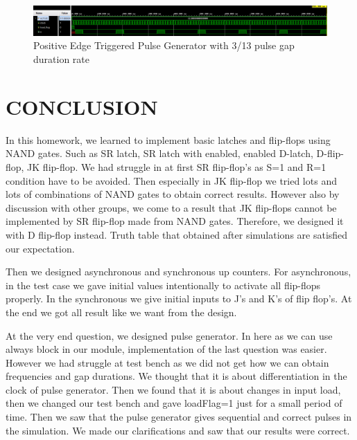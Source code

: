 \documentclass[pdftex,12pt,a4paper]{article}
\begin{document}
    \begin{figure}[H]
    	\centering
    	\includegraphics[width=1\textwidth]{simulations/pulse_3_13_gap.png}	
    	\caption{Positive Edge Triggered Pulse Generator with 3/13 pulse gap duration rate}
    	\label{Positive Edge Triggered Pulse Generator}
    \end{figure}

\pagebreak

\section{CONCLUSION}
In this homework, we learned to implement basic latches and flip-flops using NAND gates. Such as SR latch, SR latch with enabled, enabled D-latch, D-flip-flop, JK flip-flop. We had struggle in at first SR flip-flop's as S=1 and R=1 condition have to be avoided. Then especially in JK flip-flop we tried lots and lots of combinations of NAND gates to obtain correct results. However also by discussion with other groups, we come to a result that JK flip-flops cannot be implemented by SR flip-flop made from NAND gates. Therefore, we designed it with D flip-flop instead. Truth table that obtained after simulations are satisfied our expectation.

Then we designed asynchronous and synchronous up counters. For asynchronous, in the test case we gave initial values intentionally to activate all flip-flops properly. In the synchronous we give initial inputs to J's and K's of flip flop's. At the end we got all result like we want from the design.

At the very end question, we designed pulse generator. In here as we can use always block in our module, implementation of the last question was easier. However we had struggle at test bench as we did not get how we can obtain frequencies and gap durations. We thought that it is about differentiation in the clock of pulse generator. Then we found that it is about changes in input load, then we changed our test bench and gave loadFlag=1 just for a small period of time. Then we saw that the pulse generator gives sequential and correct pulses in the simulation. We made our clarifications and saw that our results were correct.
\end{document}
